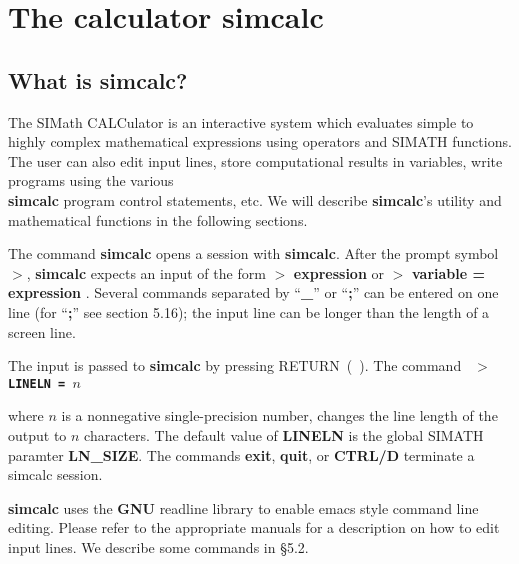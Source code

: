 %
%


\chapter{The calculator simcalc}


\section{What is simcalc?}
The SIMath CALCulator is an interactive system which evaluates simple to
highly complex mathematical expressions using operators and SIMATH functions.
The user can also edit input lines, store computational results in variables,
write programs using the various \\
{\bf simcalc} program control statements,
etc. We will describe {\bf simcalc}'s utility and mathematical functions
in the following sections.

The command {\bf simcalc} opens a session with {\bf simcalc}. 
After the prompt symbol $>$, {\bf simcalc} expects an input of the form
\leer
$>$ {\bf expression} \care
\leer
or
\leer
$>$ {\bf variable = expression} \care .
\leer
Several commands separated by ``{\bf \_}'' or ``{\bf ;}'' can be entered on one line
(for ``{\bf ;}'' see section 5.16); the input line can be longer than the length of
a screen line.

The input is passed to {\bf simcalc} by pressing
\mbox{RETURN (\ \care)}.
\leer
The command
\leer
{\tt
  {\bf $>$LINELN = $n$} \care 
}

where $n$ is a nonnegative single-precision number, changes the 
line length of the output to $n$ characters.
The default value of {\bf LINELN} is the global SIMATH paramter {\bf LN\_SIZE}.
\leer
The commands  {\bf exit}, {\bf quit}, or {\bf CTRL/D}
terminate a simcalc session.

{\bf simcalc} uses the {\bf GNU} readline library to enable emacs style command
line editing.
Please refer to the appropriate manuals 
for a description on how to edit input lines. We describe some commands 
in \S 5.2.

